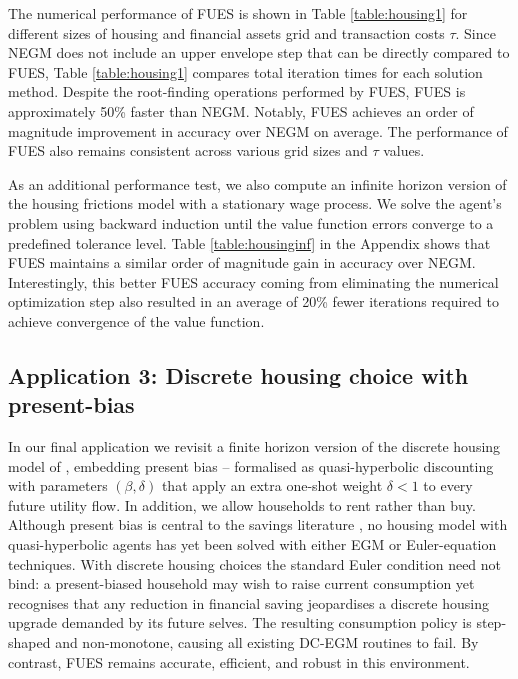 \documentclass[12pt]{article}
\begin{document}
The numerical performance of FUES is shown in Table \ref{table:housing1} for different sizes of housing and financial assets grid and transaction costs $\tau$. Since NEGM does not include an upper envelope step that can be directly compared to FUES, Table \ref{table:housing1} compares total iteration times for each solution method. Despite the root-finding operations performed by FUES, FUES is approximately 50\% faster than NEGM. Notably, FUES achieves an order of magnitude improvement in accuracy over NEGM on average. The performance of FUES also remains consistent across various grid sizes and $\tau$ values.

As an additional performance test, we also compute an infinite horizon version of the housing frictions model with a stationary wage process. We solve the agent's problem using backward induction until the value function errors converge to a predefined tolerance level. Table \ref{table:housinginf} in the Appendix shows that FUES maintains a similar order of magnitude gain in accuracy over NEGM. Interestingly, this better FUES accuracy coming from eliminating the numerical optimization step also resulted in an average of 20\% fewer iterations required to achieve convergence of the value function. 




\subsection{Application 3: Discrete housing choice with present-bias}\label{sec: Fella}

In our final application we revisit a finite horizon version of the discrete housing model of \citet{Fella2014}, embedding present bias -- formalised as quasi-hyperbolic discounting with parameters $(\beta,\delta)$ that apply an extra one-shot weight $\delta<1$ to every future utility flow. In addition, we allow households to rent rather than buy. Although present bias is central to the savings literature \citep{laibson21997,Laibson2020}, no housing model with quasi-hyperbolic agents has yet been solved with either EGM or Euler-equation techniques. With discrete housing choices the standard Euler condition need not bind: a present-biased household may wish to raise current consumption yet recognises that any reduction in financial saving jeopardises a discrete housing upgrade demanded by its future selves. The resulting consumption policy is step-shaped and non-monotone, causing all existing DC-EGM routines to fail. By contrast, FUES remains accurate, efficient, and robust in this environment.
\end{document}
